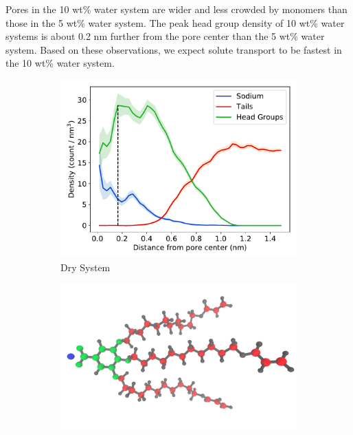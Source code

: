 \documentclass[journal=jpcbfk,manuscript=article]{achemso}
\begin{document}
  Pores in the 10 wt\% water system are wider and less crowded by monomers than
  those in the 5 wt\% water system. The peak head group density of 10 wt\% water
  systems is about 0.2 nm further from the pore center than the 5 wt\% water system. 
  Based on these observations, we expect solute transport to be fastest in the 
  10 wt\% water system.
  
  \begin{figure}[!htb]
  \centering
  \begin{subfigure}{0.45\textwidth}
  \includegraphics[width=\textwidth]{component_density_dry.pdf}
  \caption{Dry System}\label{fig:component_density_dry}
  \end{subfigure}
  \begin{subfigure}{0.45\textwidth}
  \vspace{-0.5cm}
  \includegraphics[width=\textwidth]{monomer_color_coded.pdf}

\end{subfigure}
\end{figure}
\end{document}

